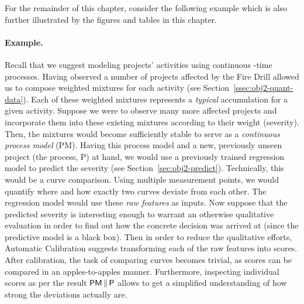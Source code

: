 \vspace{10pt}
\begin{mdframed}
        For the remainder of this chapter, consider the following example which is also further illustrated by the figures and tables in this chapter.
\end{mdframed}
%


\paragraph{Example.}
Recall that we suggest modeling projects' activities using continuous\allowbreak%
-time processes.
Having observed a number of projects affected by the Fire Drill allowed us to compose weighted mixtures for each activity (see Section~\ref{ssec:obj2-quant-data}).
Each of these weighted mixtures represents a \emph{typical} accumulation for a given activity.
Suppose we were to observe many more affected projects and incorporate them into these existing mixtures according to their weight (severity).
Then, the mixtures would become sufficiently stable to serve as a \emph{continuous process model} (\textsf{PM}).
Having this process model and a new, previously unseen project (the process, \textsf{P}) at hand, we would use a previously trained regression model to predict the severity (see Section~\ref{sec:obj2-predict}).
Technically, this would be a curve comparison.
Using multiple measurement points, we would quantify where and how exactly two curves deviate from each other.
The regression model would use these \emph{raw features} as inputs.
Now suppose that the predicted severity is interesting enough to warrant an otherwise qualitative evaluation in order to find out how the concrete decision was arrived at (since the predictive model is a black box).
Then in order to reduce the qualitative efforts, Automatic Calibration suggests transforming each of the raw features into scores.
After calibration, the task of comparing curves becomes trivial, as scores can be compared in an apples-to-apples manner.
Furthermore, inspecting individual scores as per the result $\mathsf{PM}\,\|\,\mathsf{P}$ allows to get a simplified understanding of how strong the deviations actually are.




